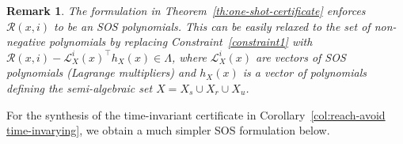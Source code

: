 \documentclass[journal,twoside,web]{ieeecolor}
\newcommand{\ml}[1]{{\color{blue}[ML: #1]}}
\newcommand{\safe}{\mathrm{s}}
\newcommand{\reach}{\mathrm{r}}
\newcommand{\RA}{\mathcal{R}}
\theoremstyle{definition}
\theoremstyle{plain}
\theoremstyle{plain}
\newtheorem{remark}{Remark}
\begin{document}
\begin{remark}
    The formulation in Theorem~\ref{th:one-shot-certificate} enforces $\RA(x,i)$ to be an SOS polynomials.  This can be easily relaxed to the set of non-negative polynomials by replacing Constraint~\eqref{constraint1} with 
    $\RA(x, i) -  \mathcal{L}^{i}_{X}(x)^{\top}h_{X}(x) \in \Lambda$, where $\mathcal{L}^{i}_{X}(x)$ are vectors of SOS polynomials (Lagrange multipliers) and $h_{X}(x)$ is a vector of polynomials defining the semi-algebraic set $X = X_s \cup X_r \cup X_u$.
\end{remark}

For the synthesis of the time-invariant certificate in Corollary~\ref{col:reach-avoid time-invarying},
we obtain a much simpler SOS formulation below.

\end{document}
